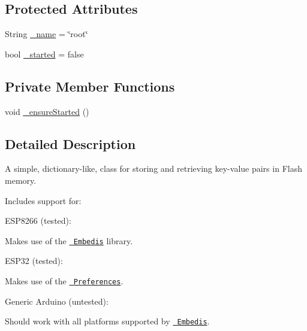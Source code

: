 \subsection*{Protected Attributes}
\begin{DoxyCompactItemize}
\item 
String \mbox{\hyperlink{class_nv_mem_flash_dict_a3c15fe330f54d1853ec7b5b2002e3190}{\+\_\+name}} = \char`\"{}root\char`\"{}
\item 
bool \mbox{\hyperlink{class_nv_mem_flash_dict_ad134004e0f89ea8b0d334d9c5cc8a795}{\+\_\+started}} = false
\end{DoxyCompactItemize}
\subsection*{Private Member Functions}
\begin{DoxyCompactItemize}
\item 
void \mbox{\hyperlink{class_nv_mem_flash_dict_a00390a7c91035e6a7f21df343f6440bc}{\+\_\+ensure\+Started}} ()
\end{DoxyCompactItemize}


\subsection{Detailed Description}
A simple, dictionary-\/like, class for storing and retrieving key-\/value pairs in Flash memory. 

Includes support for\+:


\begin{DoxyItemize}
\item E\+S\+P8266 (tested)\+:
\begin{DoxyItemize}
\item Makes use of the \href{https://github.com/thingSoC/embedis}{\texttt{ Embedis}} library.
\end{DoxyItemize}
\item E\+S\+P32 (tested)\+:
\begin{DoxyItemize}
\item Makes use of the \href{https://github.com/espressif/arduino-esp32/tree/master/libraries/Preferences}{\texttt{ Preferences}}.
\end{DoxyItemize}
\item Generic Arduino (untested)\+:
\begin{DoxyItemize}
\item Should work with all platforms supported by \href{https://github.com/thingSoC/embedis}{\texttt{ Embedis}}. 
\end{DoxyItemize}
\end{DoxyItemize}

